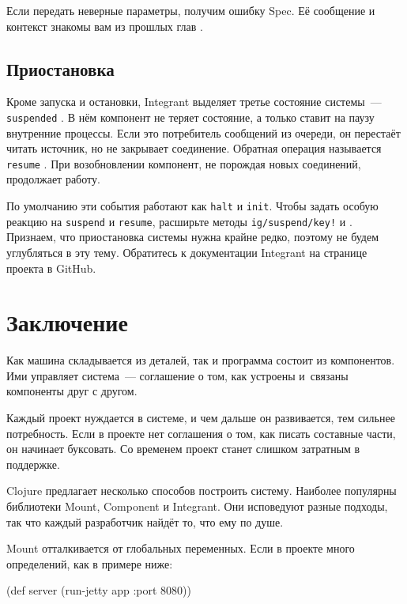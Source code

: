 \fi

\fi

Если передать неверные параметры, получим ошибку Spec. Её сообщение и контекст
знакомы вам из прошлых глав .

\subsection{Приостановка}


Кроме запуска и остановки, Integrant выделяет третье состояние системы~---
\verb|suspended| . В нём компонент не теряет состояние, а
только ставит на паузу внутренние процессы. Если это потребитель сообщений из
очереди, он перестаёт читать источник, но не закрывает соединение. Обратная
операция называется \verb|resume| . При возобновлении
компонент, не порождая новых соединений, продолжает работу.

По умолчанию эти события работают как \verb|halt| и \verb|init|. Чтобы задать
особую реакцию на \verb|suspend| и \verb|resume|, расширьте методы
\texttt{ig/suspend\-/key!} и . Признаем, что приостановка
системы нужна крайне редко, поэтому не будем углубляться в эту тему. Обратитесь
к документации Integrant на странице проекта в GitHub.

\section{Заключение}

Как машина складывается из деталей, так и программа состоит из компонентов. Ими
управляет система~--- соглашение о том, как устроены и~связаны компоненты друг с
другом.

Каждый проект нуждается в системе, и чем дальше он развивается, тем сильнее
потребность. Если в проекте нет соглашения о том, как писать составные части, он
начинает буксовать. Со временем проект станет слишком затратным в поддержке.

Clojure предлагает несколько способов построить систему. Наиболее популярны
библиотеки Mount, Component и Integrant. Они исповедуют разные подходы, так что
каждый разработчик найдёт то, что ему по душе.

Mount отталкивается от глобальных переменных. Если в проекте много определений,
как в примере ниже:

\ifnarrow

\begin{english}
  \begin{clojure}
(def server
  (run-jetty app {:port 8080}))
  \end{clojure}
\end{english}

